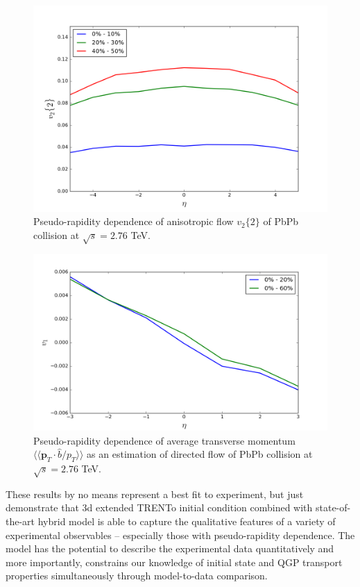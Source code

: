 \documentclass[aps,prl,twocolumn,groupedaddress]{revtex4-1}
\begin{document}
	\begin{figure}
  	\centering
	\includegraphics[width=\columnwidth]{pics/new-PbPb-vnm-eta-p1.png}
	\caption{Pseudo-rapidity dependence of anisotropic flow $v_2\{2\}$ of PbPb collision at $\sqrt{s} = 2.76$ TeV.}
  	\label{PbPb-vn-eta-calc}
	\end{figure}
	
	\begin{figure}
  	\centering
	\includegraphics[width=\columnwidth]{pics/RUN-1-PbPb-v1-eta.png}
	\caption{Pseudo-rapidity dependence of average transverse momentum $\langle\langle \mathbf{p}_T\cdot \hat{b}/p_T\rangle\rangle$ as an estimation of directed flow of PbPb collision at $\sqrt{s} = 2.76$ TeV.}
  	\label{RUN-1-PbPb-v1-eta}
	\end{figure}
	
	These results by no means represent a best fit to experiment, but just demonstrate that 3d extended TRENTo initial condition combined with state-of-the-art hybrid model is able to capture the qualitative features of a variety of experimental observables -- especially those with pseudo-rapidity dependence.
	The model has the potential to describe the experimental data quantitatively and more importantly, constrains our knowledge of initial state and QGP transport properties simultaneously through model-to-data comparison.
	
\end{document}
